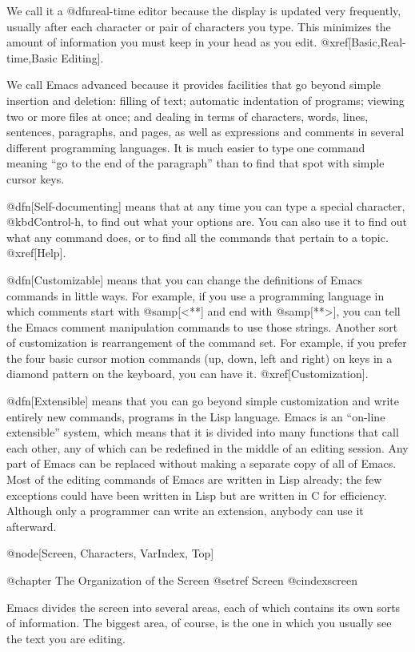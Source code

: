   We call it a @dfn{real-time} editor because the display is updated very
frequently, usually after each character or pair of characters you
type.  This minimizes the amount of information you must keep in your
head as you edit.  @xref[Basic,Real-time,Basic Editing].

  We call Emacs advanced because it provides facilities that go beyond
simple insertion and deletion: filling of text; automatic indentation of
programs; viewing two or more files at once; and dealing in terms of
characters, words, lines, sentences, paragraphs, and pages, as well as
expressions and comments in several different programming languages.  It is
much easier to type one command meaning ``go to the end of the paragraph''
than to find that spot with simple cursor keys.

  @dfn[Self-documenting] means that at any time you can type a special
character, @kbd{Control-h}, to find out what your options are.  You can
also use it to find out what any command does, or to find all the commands
that pertain to a topic.  @xref[Help].

  @dfn[Customizable] means that you can change the definitions of Emacs
commands in little ways.  For example, if you use a programming language in
which comments start with @samp[<**] and end with @samp[**>], you can tell
the Emacs comment manipulation commands to use those strings.  Another sort
of customization is rearrangement of the command set.  For example, if you
prefer the four basic cursor motion commands (up, down, left and right) on
keys in a diamond pattern on the keyboard, you can have it.
@xref[Customization].

  @dfn[Extensible] means that you can go beyond simple customization and
write entirely new commands, programs in the Lisp language.  Emacs is an
``on-line extensible'' system, which means that it is divided into many
functions that call each other, any of which can be redefined in the middle
of an editing session.  Any part of Emacs can be replaced without making a
separate copy of all of Emacs.  Most of the editing commands of Emacs are
written in Lisp already; the few exceptions could have been written in Lisp
but are written in C for efficiency.  Although only a programmer can write an
extension, anybody can use it afterward.

@node[Screen, Characters, VarIndex, Top]

@chapter The Organization of the Screen
@setref Screen
@cindex{screen}

  Emacs divides the screen into several areas, each of which contains
its own sorts of information.  The biggest area, of course, is the one
in which you usually see the text you are editing.

